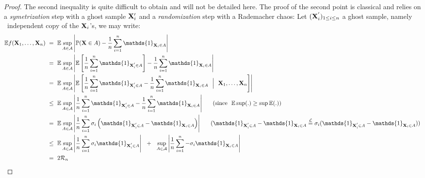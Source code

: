 \begin{proof}
The second inequality is quite difficult to obtain and will not be detailed here.%
The proof of the second point is classical and relies on a \emph{symetrization} step with a ghost sample $\mathbf X_i'$ and a \emph{randomization} step with a Rademacher chaos:
Let $(\mathbf X_i^{'})_{1 \le i \le n}$ a ghost sample, namely \iid~independent copy of the $\mathbf X_i$'s, we may write:
\begin{align*}
\mathbb{E} f(\mb X_1,\ldots,\mb X_n) &~=~ \mathbb{E} \sup_{A \in \mathcal{A}} \left | \mathbb{P}(\mb X \in A) - \frac{1}{n} \sum_{i=1}^{n}\mathds{1}_{\mb X_i \in A} \right| \\
&~=~ \mathbb{E} \sup_{A \in \mathcal{A}} \left | \mathbb{E}\left [ \frac{1}{n} \sum_{i=1}^{n}\mathds{1}_{\mb X_i^{'} \in A}\right] - \frac{1}{n} \sum_{i=1}^{n}\mathds{1}_{\mb X_i \in A} \right|\\
&~=~ \mathbb{E} \sup_{A \in \mathcal{A}} \left | \mathbb{E}\left [ \frac{1}{n} \sum_{i=1}^{n}\mathds{1}_{\mb X_i^{'} \in A} - \frac{1}{n} \sum_{i=1}^{n}\mathds{1}_{\mb X_i \in A} ~~\Big|~~ \mb X_1,\ldots,\mb X_n \right]\right|\\
&~\le~ \mathbb{E} \sup_{A \in \mathcal{A}} \left | \frac{1}{n} \sum_{i=1}^{n}\mathds{1}_{\mb X_i^{'} \in A} - \frac{1}{n} \sum_{i=1}^{n}\mathds{1}_{\mb X_i \in A} \right| ~~~~~(\text{since~~} \mathbb{E} \sup(.) \ge \sup \mathbb{E}(.) ) \\ 
&~=~ \mathbb{E} \sup_{A \in \mathcal{A}} \left |\frac{1}{n} \sum_{i=1}^{n} \sigma_i \left ( \mathds{1}_{\mb X_i^{'} \in A} - \mathds{1}_{\mb X_i \in A} \right) \right| ~~~~~(\mathds{1}_{\mb X_i^{'} \in A} - \mathds{1}_{\mb X_i \in A} \overset{\mathcal{L}}{=} \sigma_i(\mathds{1}_{\mb X_i^{'} \in A} - \mathds{1}_{\mb X_i \in A}) )  \\
&~\le~\mathbb{E} \sup_{A \in \mathcal{A}} \left |\frac{1}{n} \sum_{i=1}^{n} \sigma_i \mathds{1}_{\mb X_i^{'} \in A}  \right| ~~+~~ \sup_{A \in \mathcal{A}} \left |\frac{1}{n} \sum_{i=1}^{n} -\sigma_i \mathds{1}_{\mb X_i \in A}  \right|\\
&~=~ 2 \mathcal{R}_n
\end{align*}
\end{proof}

